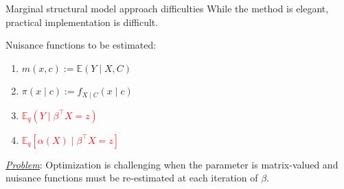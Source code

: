 \documentclass[
  ignorenonframetext,
  aspectratio=169,
  11pt]{beamer}
\providecommand{\tightlist}{%
  \setlength{\itemsep}{0pt}\setlength{\parskip}{0pt}}
\begin{document}
\begin{frame}{Marginal structural model approach difficulties}
\protect{}\label{marginal-structural-model-approach-difficulties}
While the method is elegant, practical implementation is difficult.

\pause

Nuisance functions to be estimated:

\begin{enumerate}
\tightlist
\item
  \(m(x,c):= \mathbb{E}(Y\mid X, C)\)
\item
  \(\pi(x\mid c):= f_{X\mid C}(x\mid c)\)
\item
  \textcolor<3->{red}{$\mathbb{E}_q(Y\mid\beta^\top X=z)$}
\item
  \textcolor<3->{red}{$\mathbb{E}_q[\alpha(X)\mid\beta^\top X=z]$}
\end{enumerate}

\pause

\underline{\textit{Problem}}: Optimization is challenging when the
parameter is matrix-valued and nuisance functions must be re-estimated
at each iteration of \(\beta\).
\end{frame}
\end{document}
